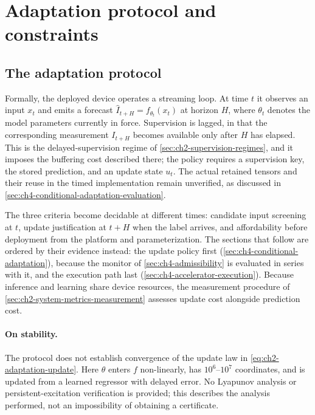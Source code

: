 \section{Adaptation protocol and constraints}
\label{sec:ch4-post-deployment-constraints}

\subsection{The adaptation protocol}
\label{sec:ch4-adaptation-protocol}
Formally, the deployed device operates a streaming loop. At time $t$ it observes an input $x_t$ and emits a forecast $\hat I_{t+H} = f_{\theta_t}(x_t)$ at horizon $H$, where $\theta_t$ denotes the model parameters currently in force. Supervision is lagged, in that the corresponding measurement $I_{t+H}$ becomes available only after $H$ has elapsed. This is the delayed-supervision regime of \cref{sec:ch2-supervision-regimes}, and it imposes the buffering cost described there; the policy requires a supervision key, the stored prediction, and an update state $u_t$. The actual retained tensors and their reuse in the timed implementation remain unverified, as discussed in \cref{sec:ch4-conditional-adaptation-evaluation}.

The three criteria become decidable at different times: candidate input screening at $t$, update justification at $t+H$ when the label arrives, and affordability before deployment from the platform and parameterization. The sections that follow are ordered by their evidence instead: the update policy first (\cref{sec:ch4-conditional-adaptation}), because the monitor of \cref{sec:ch4-admissibility} is evaluated in series with it, and the execution path last (\cref{sec:ch4-accelerator-execution}). Because inference and learning share device resources, the measurement procedure of \cref{sec:ch2-system-metrics-measurement} assesses update cost alongside prediction cost.

\paragraph{On stability.} The protocol does not establish convergence of the update law in \cref{eq:ch2-adaptation-update}. Here $\theta$ enters $f$ non-linearly, has $10^{6}$--$10^{7}$ coordinates, and is updated from a learned regressor with delayed error. No Lyapunov analysis or persistent-excitation verification is provided; this describes the analysis performed, not an impossibility of obtaining a certificate.

